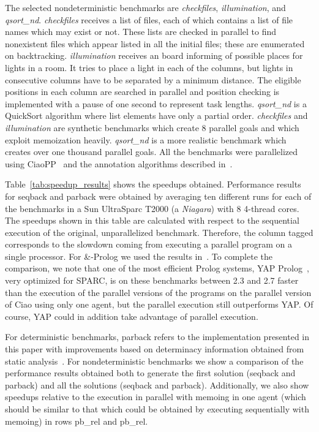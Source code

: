\documentclass{tlp}
\newcounter{mnotei} \setcounter{mnotei}{0}
\newcommand{\mnote}[1]{{\scriptsize\textsf{\textcolor{blue}{}}}\marginpar{\scriptsize\textsf{\textcolor{red}{n.\themnotei: #1}}}\stepcounter{mnotei} }
\renewcommand{\mnote}[1]{}
\begin{document}
The selected nondeterministic benchmarks are \emph{checkfiles},
\emph{illumination}, and \emph{qsort\_nd}. \emph{checkfiles} receives a
list of files, each of which contains a list of file names which may
exist or not.
These lists are checked in parallel to find nonexistent files which
appear listed in all the initial files; these are enumerated on
backtracking.
\emph{illumination} receives an  board informing of
possible places for lights in a room.  It tries to place a light in
each of the columns, but lights in consecutive columns have to be
separated by a minimum distance.  The eligible positions in each
column are searched in parallel and position checking is implemented
with a pause of one second to represent task lengths.
\emph{qsort\_nd} is a QuickSort algorithm where list elements have
only a partial order.  \emph{checkfiles} and \emph{illumination} are
synthetic benchmarks which create 8 parallel goals and which exploit
memoization heavily.
\emph{qsort\_nd} is a more realistic benchmark which creates over one
thousand parallel goals.  All the benchmarks were parallelized using CiaoPP~\cite{ciaopp-sas03-journal-scp} and the
annotation algorithms described
in~\cite{annotators-jlp,daniel-phd,uudg-annotators-lopstr2007}.

Table~\ref{tab:speedup_results} shows the speedups obtained.
Performance results for \textsf{seqback} and \textsf{parback} were
obtained by averaging ten different runs for each of the benchmarks in
a Sun UltraSparc T2000 (a \emph{Niagara}) with 8 4-thread cores.  The
speedups shown in this table are calculated with respect to the
sequential execution of the original, unparallelized benchmark.
Therefore, the column tagged  corresponds to the slowdown coming
from executing a parallel program on a single processor.  For
\textsf{\&-Prolog} we used the results in~\cite{ngc-and-prolog}. 
To complete the comparison, we note that one of the most efficient
Prolog systems, YAP Prolog~\cite{costa:yap-design-tplp}, 
very optimized for SPARC, is on these
benchmarks between 2.3 and 2.7 faster
than the execution of the
parallel versions of the programs on the parallel version of Ciao
using only one agent, but the parallel execution still outperforms
YAP.  Of course, YAP could in addition take advantage of parallel
execution.

For deterministic benchmarks, \textsf{parback} refers to the
implementation presented in this paper with improvements based on
determinacy information obtained from static
analysis~\cite{determ-lopstr04}.  For nondeterministic benchmarks we
show a comparison\mnote{Pablo, Amadeo: we do not actually say what we
  are comparing with.} of the performance results obtained both to generate
the first solution (\textsf{seqback} and
\textsf{parback}) and all the solutions
(\textsf{seqback} and \textsf{parback}).
Additionally, we also show speedups relative to the execution in
parallel with memoing in one agent (which should be similar to that
which could be obtained by executing sequentially with memoing) in
rows \textsf{pb\_rel} and \textsf{pb\_rel}.
\end{document}
